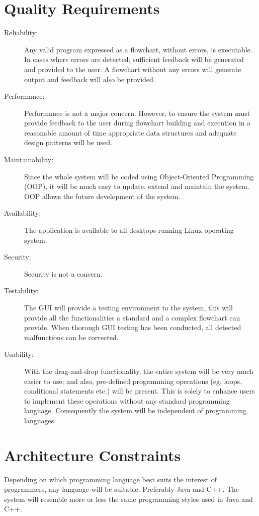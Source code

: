 \documentclass[12pt]{article}
\begin{document}
\section{Quality Requirements}
\begin{description}
  \item[Reliability:]
  	Any valid program expressed as a flowchart, without errors, is executable. In cases where errors are detected, sufficient feedback will be generated and provided to the user. A flowchart without any errors will generate output and feedback will also be provided.
 

  \item[Performance:]
  Performance is not a major concern. However, to ensure the system must provide feedback to the user during flowchart building and execution in a reasonable amount of time appropriate data structures and adequate design patterns will be used.

  \item[Maintainability:] 
  Since the whole system will be coded using Object-Oriented Programming (OOP), it will be much easy to update, extend and maintain the system. OOP allows the future development of the system.

  \item[Availability:]
  The application is available to all desktops running Linux operating system.

  \item[Security:]
  Security is not a concern.

  \item[Testability:]
  The GUI will provide a testing environment to the system, this will provide all the functionalities a standard and a complex flowchart can provide. When thorough GUI testing has been conducted, all detected malfunctions can be corrected.

  \item[Usability:]
  With the drag-and-drop functionality, the entire system will be very much easier to use; and also, pre-defined programming operations (eg. loops, conditional statements etc.) will be present. This is solely to enhance users to implement these operations without any standard programming language. Consequently the system will be independent of programming languages.
  

\end{description}
\section{Architecture Constraints}
Depending on which programming language best suits the interest of programmers, any language will be suitable. Preferably Java and C++. The system will resemble more or less the same programming styles used in Java and C++.
\end{document}

